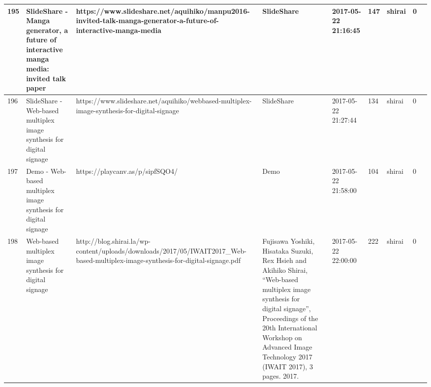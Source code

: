 \begin{longtable}{|l|l|l|l|l|l|l|l|l|l|}
195 & SlideShare - Manga generator, a future of interactive manga media: invited talk paper & https://www.slideshare.net/aquihiko/manpu2016-invited-talk-manga-generator-a-future-of-interactive-manga-media & SlideShare &  & 2017-05-22 21:16:45 & 147 & shirai & 0 &  \\ \hline 
196 & SlideShare - Web-based multiplex image synthesis for digital signage & https://www.slideshare.net/aquihiko/webbased-multiplex-image-synthesis-for-digital-signage & SlideShare &  & 2017-05-22 21:27:44 & 134 & shirai & 0 &  \\ \hline 
197 & Demo - Web-based multiplex image synthesis for digital signage & https://playcanv.as/p/sipfSQO4/ & Demo &  & 2017-05-22 21:58:00 & 104 & shirai & 0 &  \\ \hline 
198 & Web-based multiplex image synthesis for digital signage & http://blog.shirai.la/wp-content/uploads/downloads/2017/05/IWAIT2017\_Web-based-multiplex-image-synthesis-for-digital-signage.pdf & Fujisawa Yoshiki, Hisataka Suzuki, Rex Hsieh and Akihiko Shirai, “Web-based multiplex image synthesis for digital signage”, Proceedings of the 20th International Workshop on Advanced Image Technology 2017 (IWAIT 2017), 3 pages. 2017. &  & 2017-05-22 22:00:00 & 222 & shirai & 0 &  \\ \hline 
 \end{longtable}

